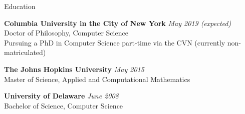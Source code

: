 \documentclass{resume} %
\begin{document}

\begin{rSection}{Education}

{\bf Columbia University in the City of New York} \hfill {\em May 2019 (expected)} \\ 
Doctor of Philosophy, Computer Science \\
Pursuing a PhD in Computer Science part-time via the CVN (currently non-matriculated)

{\bf The Johns Hopkins University} \hfill {\em May 2015} \\
Master of Science, Applied and Computational Mathematics

{\bf University of Delaware} \hfill {\em June 2008} \\
Bachelor of Science, Computer Science

\end{rSection}

\end{document}
